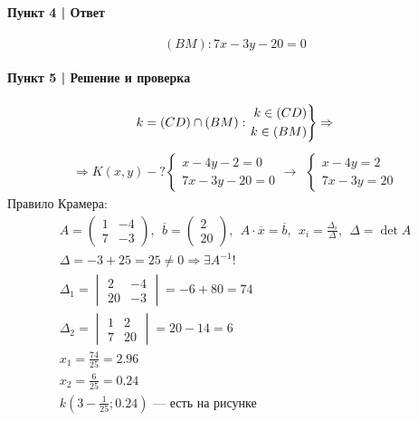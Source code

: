\documentclass{article}
\newenvironment{rcases}
    {\left.\begin{aligned}}
    {\end{aligned}\right\rbrace}
\begin{document}
\paragraph{Пункт 4 | Ответ}
\[
    (BM): 7x - 3y - 20 = 0
\]

\paragraph{Пункт 5 | Решение и проверка}
\begin{align*}
    k = (CD) \cap (BM):
    \begin{rcases}
        k \in (CD) \\
        k \in (BM)
    \end{rcases} \Rightarrow
\end{align*}
\begin{gather*}
    \Rightarrow K(x, y) - ?
    \begin{cases}
        x - 4y - 2 = 0 \\
        7x - 3y - 20 = 0
    \end{cases} \rightarrow~~
    \begin{cases}
        x - 4y = 2 \\
        7x - 3y = 20
    \end{cases}
\end{gather*}
Правило Крамера:
\begin{gather*}
    A = \begin{pmatrix}
        1 & -4 \\
        7 & -3
    \end{pmatrix}, ~~
    \overline{b} = \begin{pmatrix}
        2  \\
        20
    \end{pmatrix}, ~~
    A \cdot \overline{x} = \overline{b}, ~~
    x_i = \frac{\Delta_i}{\Delta}, ~~
    \Delta = \det A \\
    \Delta = -3 + 25 = 25 \neq 0 \Rightarrow \exists A^{-1}! \\
    \Delta_1 = \begin{vmatrix}
        2  & -4 \\
        20 & -3
    \end{vmatrix} = -6 + 80 = 74 \\
    \Delta_2 = \begin{vmatrix}
        1 &  2 \\
        7 & 20
    \end{vmatrix} = 20 - 14 = 6 \\
    x_1 = \frac{74}{25} = 2.96 \\
    x_2 = \frac{6}{25}  = 0.24  \\
    k(3 - \frac{1}{25}; 0.24) \text{ --- есть на рисунке}
\end{gather*}
\end{document}
